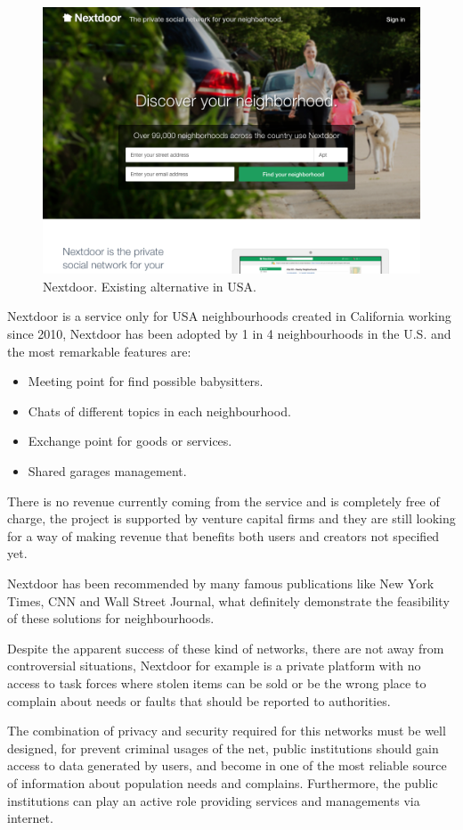 \documentclass{DeustoFDP}
\begin{document}
\begin{figure}[H]
\centering
\includegraphics[width=0.7\linewidth]{fig/nextdoor}
\caption[Nextdoor]{Nextdoor. Existing alternative in USA.}
\label{fig:nextdoor}
\end{figure}
Nextdoor is a service only for USA neighbourhoods created in California working since 2010, Nextdoor has been adopted by 1 in 4 neighbourhoods in the U.S. \cite{theverge} and the most remarkable features are:

\begin{itemize}
	\item Meeting point for find possible babysitters.
	\item Chats of different topics in each neighbourhood.
	\item Exchange point for goods or services.
	\item Shared garages management.
\end{itemize}

There is no revenue currently coming from the service and is completely free of charge, the project is supported by venture capital firms \cite{venturebeat} and they are still looking for a way of making revenue that benefits both users and creators not specified yet.
 
Nextdoor has been recommended by many famous publications like New York Times, CNN and Wall Street Journal, what definitely demonstrate the feasibility of these solutions for neighbourhoods.

Despite the apparent success of these kind of networks, there are not away from controversial situations, Nextdoor for example is a private platform with no access to task forces where stolen items can be sold \cite{geekwire} or be the wrong place to complain about needs or faults that should be reported to authorities.

The combination of privacy and security required for this networks must be well designed, for prevent criminal usages of the net, public institutions should gain access to data generated by users, and become in one of the most reliable source of information about population needs and complains. Furthermore, the public institutions can play an active role providing services and managements via internet.
\end{document}
